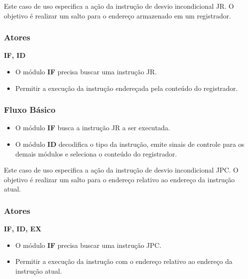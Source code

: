 
Este caso de uso especifica a ação da instrução de desvio incondicional JR. O objetivo é realizar um salto para o endereço armazenado em um registrador.
 
\subsubsection*{Atores}
\textbf{IF, ID}

\preconditions 
\begin{itemize}
 \item O módulo \textbf{IF} precisa buscar uma instrução JR.
\end{itemize}

\postconditions
\begin{itemize}
  \item Permitir a execução da instrução endereçada pela conteúdo do registrador.
\end{itemize}

\subsubsection*{Fluxo Básico}
\begin{itemize}
\item O módulo \textbf{IF} busca a instrução JR a ser executada.
\item O módulo \textbf{ID} decodifica o tipo da instrução, emite sinais de controle para os demais módulos e seleciona o conteúdo do registrador. 
\end{itemize}


Este caso de uso especifica a ação da instrução de desvio incondicional JPC. O objetivo é realizar um salto para o endereço relativo ao endereço da instrução atual.
 
\subsubsection*{Atores}
\textbf{IF, ID, EX}

\preconditions 
\begin{itemize}
 \item O módulo \textbf{IF} precisa buscar uma instrução JPC.
\end{itemize}

\postconditions
\begin{itemize}
  \item Permitir a execução da instrução com o endereço relativo ao endereço da instrução atual.
\end{itemize}

